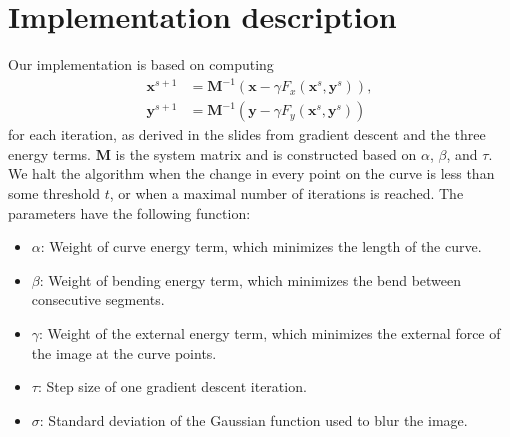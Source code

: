 \documentclass[11pt,a4paper]{article}
\begin{document}
\section{Implementation description}
%
Our implementation is based on computing
%
\begin{align}
\mathbf{x}^{s+1} &= \mathbf{M}^{-1} (\mathbf{x} - \gamma F_x(\mathbf{x}^s, \mathbf{y}^s)), \\
\mathbf{y}^{s+1} &= \mathbf{M}^{-1} (\mathbf{y} - \gamma F_y(\mathbf{x}^s, \mathbf{y}^s))
\end{align}
%
for each iteration, as derived in the slides from gradient descent and the three energy terms. $\mathbf{M}$ is the system matrix and is constructed based on $\alpha$, $\beta$, and $\tau$. We halt the algorithm when the change in every point on the curve is less than some threshold $t$, or when a maximal number of iterations is reached. The parameters have the following function:
%
\begin{itemize}
\item $\alpha$: Weight of curve energy term, which minimizes the length of the curve.
\item $\beta$: Weight of bending energy term, which minimizes the bend between consecutive segments.
\item $\gamma$: Weight of the external energy term, which minimizes the external force of the image at the curve points.
\item $\tau$: Step size of one gradient descent iteration.
\item $\sigma$: Standard deviation of the Gaussian function used to blur the image.
\end{itemize}
%
\end{document}
